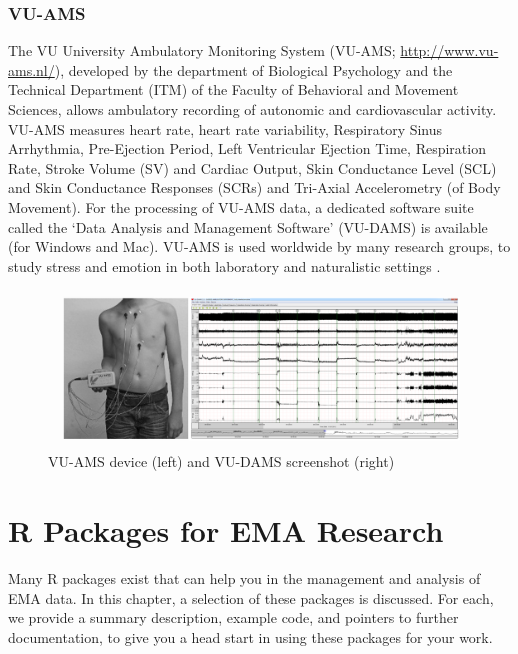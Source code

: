 \documentclass[]{book}
\begin{document}
\subsection{VU-AMS}\label{vu-ams}

 

The VU University Ambulatory Monitoring System (VU-AMS;
\url{http://www.vu-ams.nl/}), developed by the department of Biological
Psychology and the Technical Department (ITM) of the Faculty of
Behavioral and Movement Sciences, allows ambulatory recording of
autonomic and cardiovascular activity. VU-AMS measures heart rate, heart
rate variability, Respiratory Sinus Arrhythmia, Pre-Ejection Period,
Left Ventricular Ejection Time, Respiration Rate, Stroke Volume (SV) and
Cardiac Output, Skin Conductance Level (SCL) and Skin Conductance
Responses (SCRs) and Tri-Axial Accelerometry (of Body Movement). For the
processing of VU-AMS data, a dedicated software suite called the `Data
Analysis and Management Software' (VU-DAMS) is available (for Windows
and Mac). VU-AMS is used worldwide by many research groups, to study
stress and emotion in both laboratory and naturalistic settings
\citep{DeGeus1995, Geus1996, Willemsen1996}.

\begin{figure}[!t]

{\centering \includegraphics[width=1\linewidth]{images/instruments/VU-AMS/VU_AMS2} 

}

\caption{VU-AMS device (left) and VU-DAMS screenshot (right)}\label{fig:vu-ams}
\end{figure}

\chapter{R Packages for EMA Research}\label{rcat}

Many R packages exist that can help you in the management and analysis
of EMA data. In this chapter, a selection of these packages is
discussed. For each, we provide a summary description, example code, and
pointers to further documentation, to give you a head start in using
these packages for your work.
\end{document}
